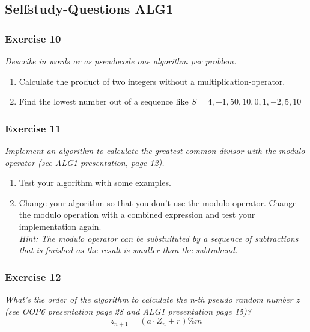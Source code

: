 \subsection{Selfstudy-Questions ALG1}

\subsubsection*{Exercise 10}
\textit{Describe in words or as pseudocode one algorithm per problem.}
\begin{enumerate}[label={(\alph*)}]
	\item Calculate the product of two integers without a multiplication-operator.
	\item Find the lowest number out of a sequence like $S = {4,-1,50,10,0,1,-2,5,10}$
\end{enumerate}

\subsubsection*{Exercise 11}
\textit{Implement an algorithm to calculate the greatest common divisor
with the modulo operator (see ALG1 presentation, page 12).}
\begin{enumerate}[label={(\alph*)}]
	\item Test your algorithm with some examples.
	\item Change your algorithm so that you don't use the modulo operator. 
		Change the modulo operation with a combined expression and test 
		your implementation again. \\
		\textit{Hint: The modulo operator can be substuituted by a 
			sequence of subtractions that is finished as the 
			result is smaller than the subtrahend.}
\end{enumerate}

\subsubsection*{Exercise 12}
\textit{What's the order of the algorithm to calculate the n-th pseudo random 
number z (see OOP6 presentation page 28 and ALG1 presentation page 15)?}
\[ z_{n+1} = (a \cdot Z_n + r) \% m \]
